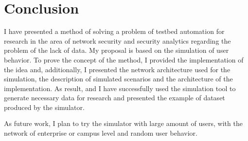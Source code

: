 
\section{Conclusion}

I have presented a method of solving a problem of testbed automation for research in the area of network security and security analytics regarding the problem of the lack of data. My proposal is based on the simulation of user behavior. To prove the concept of the method, I provided the implementation of the idea and, additionally, I presented the network  architecture used for the simulation, the description of simulated scenarios and the architecture of the implementation. As result, and I have successfully used the simulation tool to generate necessary data for research and presented the example of dataset produced by the simulator.

As future work, I plan to try the simulator with large amount of users, with the network of enterprise or campus level and random user behavior.